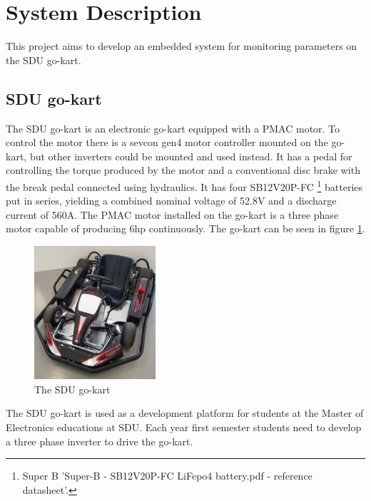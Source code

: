 \section{System Description}
\label{sec:system_description}
This project aims to develop an embedded system for monitoring parameters on the SDU go-kart.

\subsection{SDU go-kart}
The SDU go-kart is an electronic go-kart equipped with a PMAC motor. 
To control the motor there is a sevcon gen4 motor controller mounted on the go-kart, but other inverters could be mounted and used instead.
It has a pedal for controlling the torque produced by the motor and a conventional disc brake with the break pedal connected using hydraulics.
It has four SB12V20P-FC \footnote{Super B 'Super-B - SB12V20P-FC LiFepo4 battery.pdf - reference datasheet'.} batteries put in series, yielding a combined nominal voltage of 52.8V and a discharge current of 560A.
The PMAC motor installed on the go-kart is a three phase motor capable of producing 6hp continuously.
The go-kart can be seen in figure \ref{fig:go_kart}.

\begin{figure}[h]
 	\centering
    \includegraphics[width=0.4\textwidth]{graphics/go_kart}
    \caption{The SDU go-kart}
    \label{fig:go_kart}
\end{figure}

The SDU go-kart is used as a development platform for students at the Master of Electronics educations at SDU.
Each year first semester students need to develop a three phase inverter to drive the go-kart.

